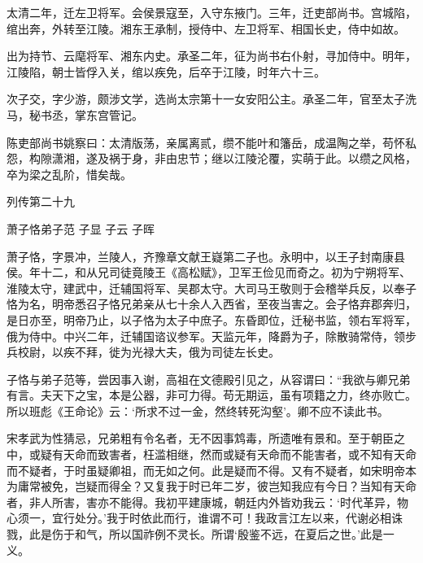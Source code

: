 \documentclass[12pt,UTF8]{ctexbook}
\begin{document}
太清二年，迁左卫将军。会侯景寇至，入守东掖门。三年，迁吏部尚书。宫城陷，绾出奔，外转至江陵。湘东王承制，授侍中、左卫将军、相国长史，侍中如故。

出为持节、云麾将军、湘东内史。承圣二年，征为尚书右仆射，寻加侍中。明年，江陵陷，朝士皆俘入关，绾以疾免，后卒于江陵，时年六十三。

次子交，字少游，颇涉文学，选尚太宗第十一女安阳公主。承圣二年，官至太子洗马，秘书丞，掌东宫管记。

陈吏部尚书姚察曰：太清版荡，亲属离贰，缵不能叶和籓岳，成温陶之举，苟怀私怨，构隙潇湘，遂及祸于身，非由忠节；继以江陵沦覆，实萌于此。以缵之风格，卒为梁之乱阶，惜矣哉。





列传第二十九

萧子恪弟子范 子显 子云 子晖

萧子恪，字景冲，兰陵人，齐豫章文献王嶷第二子也。永明中，以王子封南康县侯。年十二，和从兄司徒竟陵王《高松赋》，卫军王俭见而奇之。初为宁朔将军、淮陵太守，建武中，迁辅国将军、吴郡太守。大司马王敬则于会稽举兵反，以奉子恪为名，明帝悉召子恪兄弟亲从七十余人入西省，至夜当害之。会子恪弃郡奔归，是日亦至，明帝乃止，以子恪为太子中庶子。东昏即位，迁秘书监，领右军将军，俄为侍中。中兴二年，迁辅国谘议参军。天监元年，降爵为子，除散骑常侍，领步兵校尉，以疾不拜，徙为光禄大夫，俄为司徒左长史。

子恪与弟子范等，尝因事入谢，高祖在文德殿引见之，从容谓曰：“我欲与卿兄弟有言。夫天下之宝，本是公器，非可力得。苟无期运，虽有项籍之力，终亦败亡。所以班彪《王命论》云：‘所求不过一金，然终转死沟壑’。卿不应不读此书。

宋孝武为性猜忌，兄弟粗有令名者，无不因事鸩毒，所遗唯有景和。至于朝臣之中，或疑有天命而致害者，枉滥相继，然而或疑有天命而不能害者，或不知有天命而不疑者，于时虽疑卿祖，而无如之何。此是疑而不得。又有不疑者，如宋明帝本为庸常被免，岂疑而得全？又复我于时已年二岁，彼岂知我应有今日？当知有天命者，非人所害，害亦不能得。我初平建康城，朝廷内外皆劝我云：‘时代革异，物心须一，宜行处分。’我于时依此而行，谁谓不可！我政言江左以来，代谢必相诛戮，此是伤于和气，所以国祚例不灵长。所谓‘殷鉴不远，在夏后之世。’此是一义。
\end{document}
